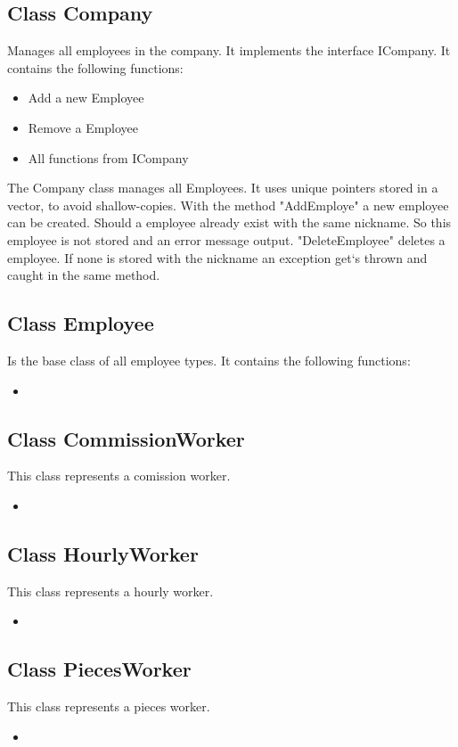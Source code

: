\subsection{Class Company}
Manages all employees in the company. It implements the interface ICompany.
It contains the following functions:
\begin{itemize}
	\item Add a new Employee
	\item Remove a Employee
	\item All functions from ICompany
\end{itemize}

The Company class manages all Employees. It uses unique pointers stored in a vector, to avoid shallow-copies.
With the method "AddEmploye" a new employee can be created. Should a employee already exist with the same nickname. So this employee is not stored and an error message output.
"DeleteEmployee" deletes a employee. If none is stored with the nickname an exception get`s thrown and caught in the same method.

\subsection{Class Employee}
Is the base class of all employee types.
It contains the following functions:
\begin{itemize}
	\item 
\end{itemize}

\subsection{Class CommissionWorker}
This class represents a comission worker.
\begin{itemize}
	\item
\end{itemize}

\subsection{Class HourlyWorker}
This class represents a hourly worker.
\begin{itemize}
	\item
\end{itemize}

\subsection{Class PiecesWorker}
This class represents a pieces worker.
\begin{itemize}
	\item
\end{itemize}

